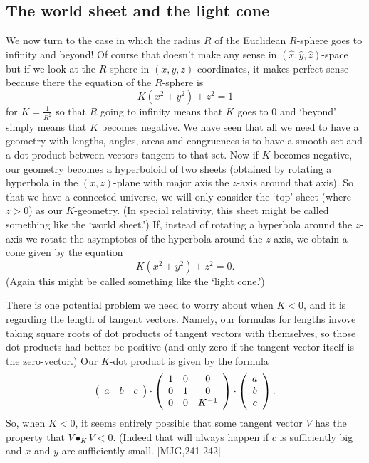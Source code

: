 \documentclass{article}%
\begin{document}
\subsection{The world sheet and the light cone}

We now turn to the case in which the radius $R$ of the Euclidean $R$-sphere
goes to infinity and beyond! Of course that doesn't make any sense in $\left(
\hat{x},\hat{y},\hat{z}\right)  $-space but if we look at the $R$-sphere in
$\left(  x,y,z\right)  $-coordinates, it makes perfect sense because there the
equation of the $R$-sphere is%
\begin{equation}
K\left(  x^{2}+y^{2}\right)  +z^{2}=1 \label{81}%
\end{equation}
for $K=\frac{1}{R^{2}}$ so that $R$ going to infinity means that $K$ goes to
$0$ and `beyond' simply means that $K$ becomes negative. We have seen that all
we need to have a geometry with lengths, angles, areas and congruences is to
have a smooth set and a dot-product between vectors tangent to that set. Now
if $K$ becomes negative, our geometry becomes a hyperboloid of two sheets
(obtained by rotating a hyperbola in the $\left(  x,z\right)  $-plane with
major axis the $z$-axis around that axis). So that we have a connected
universe, we will only consider the `top' sheet (where $z>0$) as our
$K$-geometry. (In special relativity, this sheet might be called something
like the `world sheet.') If, instead of rotating a hyperbola around the
$z$-axis we rotate the asymptotes of the hyperbola around the $z$-axis, we
obtain a cone given by the equation%
\[
K\left(  x^{2}+y^{2}\right)  +z^{2}=0.
\]
(Again this might be called something like the `light cone.')

There is one potential problem we need to worry about when $K<0$, and it is
regarding the length of tangent vectors. Namely, our formulas for lengths
invove taking square roots of dot products of tangent vectors with themselves,
so those dot-products had better be positive (and only zero if the tangent
vector itself is the zero-vector.) Our $K$-dot product is given by the formula%
\[
\left(
\begin{array}
[c]{ccc}%
a & b & c
\end{array}
\right)  \cdot\left(
\begin{array}
[c]{ccc}%
1 & 0 & 0\\
0 & 1 & 0\\
0 & 0 & K^{-1}%
\end{array}
\right)  \cdot\left(
\begin{array}
[c]{c}%
a\\
b\\
c
\end{array}
\right)  .
\]
So, when $K<0$, it seems entirely possible that some tangent vector $V$ has
the property that $V\bullet_{K}V<0$. (Indeed that will always happen if $c$ is
sufficiently big and $x$ and $y$ are sufficiently small.
[MJG,241-242]\pagebreak
\end{document}
